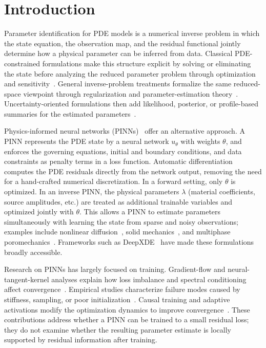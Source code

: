\documentclass[preprint,12pt]{elsarticle}
\begin{document}
\section{Introduction}

Parameter identification for PDE models is a numerical inverse problem in which the state equation, the observation map, and the residual functional jointly determine how a physical parameter can be inferred from data.  Classical PDE-constrained formulations make this structure explicit by solving or eliminating the state before analyzing the reduced parameter problem through optimization and sensitivity~\cite{becker2005parameter}.  General inverse-problem treatments formalize the same reduced-space viewpoint through regularization and parameter-estimation theory~\cite{engl1996regularization,tarantola2005inverse}.  Uncertainty-oriented formulations then add likelihood, posterior, or profile-based summaries for the estimated parameters~\cite{pedretscher2019parameter,aster2018parameter}.

Physics-informed neural networks (PINNs)~\cite{raissi2019physics} offer an alternative approach.  A PINN represents the PDE state by a neural network $u_\theta$ with weights $\theta$, and enforces the governing equations, initial and boundary conditions, and data constraints as penalty terms in a loss function.  Automatic differentiation computes the PDE residuals directly from the network output, removing the need for a hand-crafted numerical discretization.  In a forward setting, only $\theta$ is optimized.  In an inverse PINN, the physical parameters $\lambda$ (material coefficients, source amplitudes, etc.) are treated as additional trainable variables and optimized jointly with $\theta$.  This allows a PINN to estimate parameters simultaneously with learning the state from sparse and noisy observations; examples include nonlinear diffusion~\cite{kadeethum2020pinns}, solid mechanics~\cite{haghighat2021physics}, and multiphase poromechanics~\cite{amini2023inverse}.  Frameworks such as DeepXDE~\cite{lu2021deepxde} have made these formulations broadly accessible.

Research on PINNs has largely focused on training.  Gradient-flow and neural-tangent-kernel analyses explain how loss imbalance and spectral conditioning affect convergence~\cite{wang2021understanding,wang2022ntk}.  Empirical studies characterize failure modes caused by stiffness, sampling, or poor initialization~\cite{krishnapriyan2021characterizing}.  Causal training and adaptive activations modify the optimization dynamics to improve convergence~\cite{wang2022respecting,jagtap2020adaptive}.  These contributions address whether a PINN can be trained to a small residual loss; they do not examine whether the resulting parameter estimate is locally supported by residual information after training.
\end{document}
